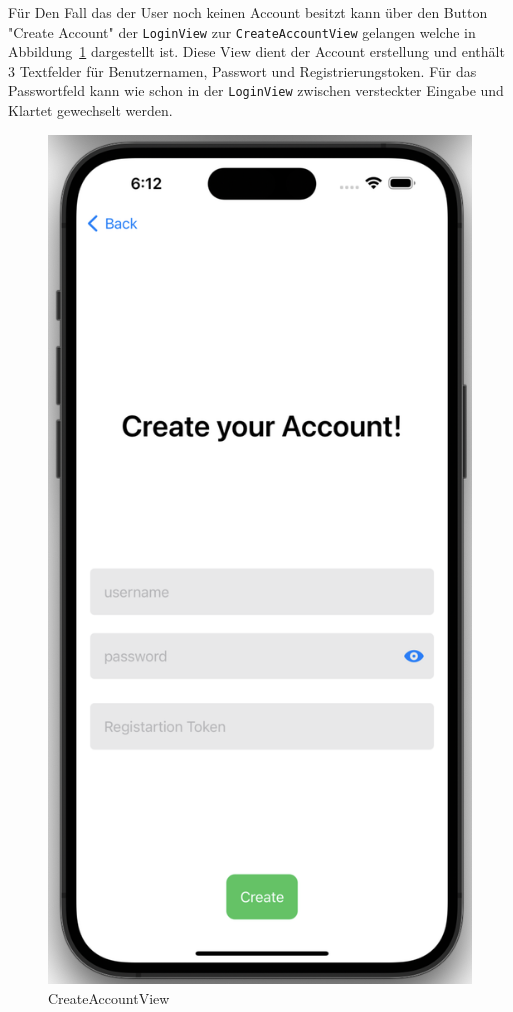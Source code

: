     Für Den Fall das der User noch keinen Account besitzt kann über den Button "Create Account" der \texttt{LoginView} zur \texttt{CreateAccountView} gelangen welche in Abbildung~\ref{fig:createaccountview} dargestellt ist.
    Diese View dient der Account erstellung und enthält 3 Textfelder für Benutzernamen, Passwort und Registrierungstoken.
    Für das Passwortfeld kann wie schon in der \texttt{LoginView} zwischen versteckter Eingabe und Klartet gewechselt werden.
    \begin{figure}[h]
        \includegraphics[scale=0.5]{accountcreate}
        \centering
        \caption{CreateAccountView}\label{fig:createaccountview}
    \end{figure}
